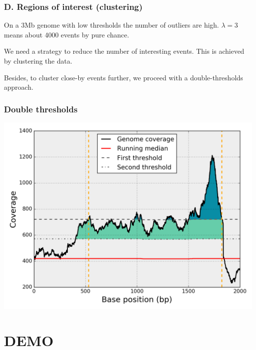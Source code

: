 \documentclass{beamer}
\begin{document}
\begin{frame}
\frametitle{D. Regions of interest (clustering)}

\begin{block}{}
On a 3Mb genome with low thresholds the number of outliers are high. 
$\lambda=3$ means about 4000 events by pure chance.
\end{block}

\begin{block}{}
We need a strategy to reduce the number of interesting events. This is 
achieved by clustering the data.
\end{block}

\begin{block}{}
Besides, to cluster close-by events further, we proceed with a double-thresholds 
approach.
\end{block}
 
\end{frame}


\begin{frame}
 \frametitle{Double thresholds}
\includegraphics[height=0.9\textheight, 
    width=1\textwidth]{images/double_threshold.png}
\end{frame}


\section{DEMO}
\end{document}
